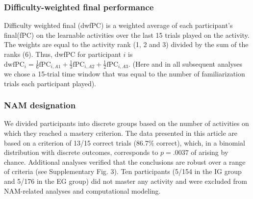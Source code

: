     \subsubsection*{Difficulty-weighted final performance}\label{subsubsec:methods/analysis/dwfpc}
    Difficulty weighted final {\PC} (dwfPC) is a weighted average of each participant’s final{\PC}(fPC) on the learnable activities over the last 15 trials played on the activity. The weights are equal to the activity rank (1, 2 and 3) divided by the sum of the ranks (6). Thus, dwfPC for participant $i$ is $\text{dwfPC}_i = \frac{1}{6}\text{fPC}_{i,A1} + \frac{1}{3}\text{fPC}_{i,A2} + \frac{1}{2}\text{fPC}_{i,A3}$. (Here and in all subsequent analyses we chose a 15-trial time window that was equal to the number of familiarization trials each participant played).
     
    \subsubsection*{NAM designation}\label{subsubsec:methods/analysis/nam}
    We divided participants into discrete groups based on the number of activities on which they reached a mastery criterion. The data presented in this article are based on a criterion of 13/15 correct trials ($86.7\%$ correct), which, in a binomial distribution with discrete outcomes, corresponds to $p = .0037$ of arising by chance. Additional analyses verified that the conclusions are robust over a range of criteria (see Supplementary Fig. 3). Ten participants (5/154 in the IG group and 5/176 in the EG group) did not master any activity and were excluded from NAM-related analyses and computational modeling.
     
